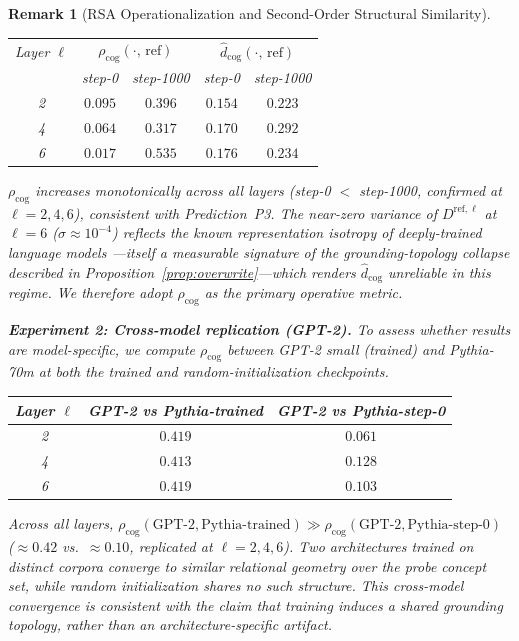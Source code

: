 \documentclass[12pt]{article}
\newtheorem{remark}{Remark}
\begin{document}
\begin{remark}[RSA Operationalization and Second-Order Structural Similarity]
\begin{center}
\begin{tabular}{ccccc}
\hline
Layer $\ell$ & \multicolumn{2}{c}{$\rho_\mathrm{cog}(\cdot,\,\mathrm{ref})$}
             & \multicolumn{2}{c}{$\hat{d}_\mathrm{cog}(\cdot,\,\mathrm{ref})$} \\
             & step-0 & step-1000 & step-0 & step-1000 \\
\hline
2 & $0.095$ & $0.396$ & $0.154$ & $0.223$ \\
4 & $0.064$ & $0.317$ & $0.170$ & $0.292$ \\
6 & $0.017$ & $0.535$ & $0.176$ & $0.234$ \\
\hline
\end{tabular}
\end{center}

\noindent
$\rho_\mathrm{cog}$ increases monotonically across all layers
(step-0 $<$ step-1000, confirmed at $\ell = 2, 4, 6$),
consistent with Prediction~P3.
The near-zero variance of $D^{\mathrm{ref},\ell}$
at $\ell = 6$ ($\sigma \approx 10^{-4}$) reflects the known
representation isotropy of deeply-trained language models
\cite{ethayarajh2019}---itself a measurable signature of the
grounding-topology collapse described in Proposition~\ref{prop:overwrite}---which
renders $\hat{d}_\mathrm{cog}$ unreliable in this regime.
We therefore adopt $\rho_\mathrm{cog}$ as the primary operative metric.

\smallskip
\noindent\textbf{Experiment 2: Cross-model replication (GPT-2).}
To assess whether results are model-specific, we compute
$\rho_\mathrm{cog}$ between GPT-2 small (trained) and
Pythia-70m at both the trained and random-initialization checkpoints.

\begin{center}
\begin{tabular}{ccc}
\hline
Layer $\ell$ & GPT-2 vs Pythia-trained & GPT-2 vs Pythia-step-0 \\
\hline
2 & $0.419$ & $0.061$ \\
4 & $0.413$ & $0.128$ \\
6 & $0.419$ & $0.103$ \\
\hline
\end{tabular}
\end{center}

\noindent
Across all layers,
$\rho_\mathrm{cog}(\text{GPT-2}, \text{Pythia-trained})
  \gg \rho_\mathrm{cog}(\text{GPT-2}, \text{Pythia-step-0})$
($\approx 0.42$ vs.\ $\approx 0.10$, replicated at $\ell = 2, 4, 6$).
Two architectures trained on distinct corpora converge to similar
relational geometry over the probe concept set,
while random initialization shares no such structure.
This cross-model convergence is consistent with the claim that
training induces a shared grounding topology, rather than an
architecture-specific artifact.


\end{remark}
\end{document}
